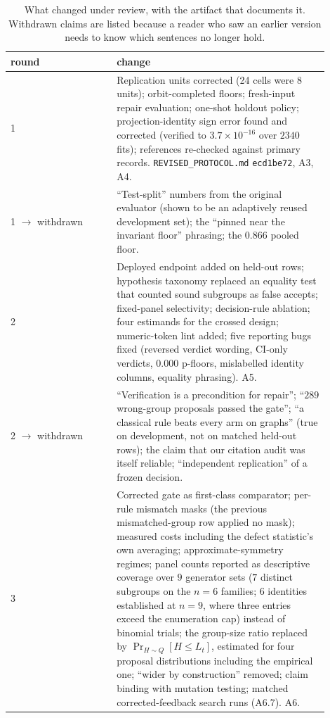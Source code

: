 \documentclass[11pt]{article}
\begin{document}
\begin{table}[t]
\centering
\caption{What changed under review, with the artifact that documents it. Withdrawn claims are
listed because a reader who saw an earlier version needs to know which sentences no longer
hold.}
\label{tab:audit}
\small
\begin{tabular}{@{}p{0.30\linewidth}p{0.60\linewidth}@{}}
\toprule
round & change \\
\midrule
1 & Replication units corrected (24 cells were $8$ units); orbit-completed floors;
fresh-input repair evaluation; one-shot holdout policy; projection-identity sign error found
and corrected (verified to $3.7\times10^{-16}$ over $2340$ fits); references re-checked against
primary records. \texttt{REVISED\_PROTOCOL.md} \texttt{ecd1be72}, A3, A4. \\
1 $\to$ withdrawn & ``Test-split'' numbers from the original evaluator (shown to be an
adaptively reused development set); the ``pinned near the invariant floor'' phrasing; the
$0.866$ pooled floor. \\
2 & Deployed endpoint added on held-out rows; hypothesis taxonomy replaced an equality test
that counted sound subgroups as false accepts; fixed-panel selectivity; decision-rule ablation;
four estimands for the crossed design; numeric-token lint added; five reporting bugs fixed
(reversed verdict wording, CI-only verdicts, $0.000$ p-floors, mislabelled identity columns,
equality phrasing). A5. \\
2 $\to$ withdrawn & ``Verification is a precondition for repair''; ``$289$ wrong-group
proposals passed the gate''; ``a classical rule beats every arm on graphs'' (true on
development, not on matched held-out rows); the claim that our citation audit was itself
reliable; ``independent replication'' of a frozen decision. \\
3 & Corrected gate as first-class comparator; per-rule mismatch masks (the previous
mismatched-group row applied no mask); measured costs including the defect statistic's own
averaging; approximate-symmetry regimes; panel counts reported as descriptive coverage over
$9$ generator sets ($7$ distinct subgroups on the $n{=}6$ families; $6$ identities established
at $n{=}9$, where three entries exceed the enumeration cap) instead of binomial trials; the
group-size ratio replaced by $\Pr_{H\sim Q}[H \le L_t]$, estimated for four proposal
distributions including the empirical one; ``wider by construction'' removed; claim binding
with mutation testing; matched corrected-feedback search runs (A6.7). A6. \\

\end{tabular}
\end{table}
\end{document}
